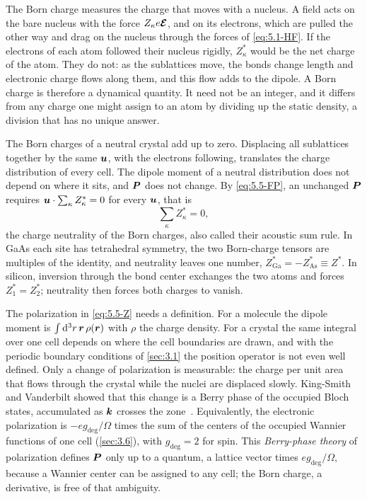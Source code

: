 The Born charge measures the charge that moves with a nucleus. A field acts on the bare nucleus with the force $Z_\kappa e\bm{\mathcal{E}}$, and on its electrons, which are pulled the other way and drag on the nucleus through the forces of \cref{eq:5.1-HF}. If the electrons of each atom followed their nucleus rigidly, $Z^*_\kappa$ would be the net charge of the atom. They do not: as the sublattices move, the bonds change length and electronic charge flows along them, and this flow adds to the dipole. A Born charge is therefore a dynamical quantity. It need not be an integer, and it differs from any charge one might assign to an atom by dividing up the static density, a division that has no unique answer.

The Born charges of a neutral crystal add up to zero. Displacing all sublattices together by the same $\bm{u}$, with the electrons following, translates the charge distribution of every cell. The dipole moment of a neutral distribution does not depend on where it sits, and $\bm{P}$ does not change. By \cref{eq:5.5-FP}, an unchanged $\bm{P}$ requires $\bm{u}\cdot\sum_\kappa Z^*_\kappa = 0$ for every $\bm{u}$, that is
\begin{equation}
  \sum_\kappa Z^*_\kappa = 0 ,
  \label{eq:5.5-neutral}
\end{equation}
the charge neutrality of the Born charges, also called their acoustic sum rule. In GaAs each site has tetrahedral symmetry, the two Born-charge tensors are multiples of the identity, and neutrality leaves one number, $Z^*_{\mathrm{Ga}} = -Z^*_{\mathrm{As}} \equiv Z^*$. In silicon, inversion through the bond center exchanges the two atoms and forces $Z^*_1 = Z^*_2$; neutrality then forces both charges to vanish.

The polarization in \cref{eq:5.5-Z} needs a definition. For a molecule the dipole moment is $\int\mathrm{d}^3r\,\bm{r}\,\rho(\bm{r})$ with $\rho$ the charge density. For a crystal the same integral over one cell depends on where the cell boundaries are drawn, and with the periodic boundary conditions of \cref{sec:3.1} the position operator is not even well defined. Only a change of polarization is measurable: the charge per unit area that flows through the crystal while the nuclei are displaced slowly. King-Smith and Vanderbilt showed that this change is a Berry phase of the occupied Bloch states, accumulated as $\bm{k}$ crosses the zone~\cite{kingsmith1993theory}. Equivalently, the electronic polarization is $-eg_{\mathrm{deg}}/\Omega$ times the sum of the centers of the occupied Wannier functions of one cell (\cref{sec:3.6}), with $g_{\mathrm{deg}} = 2$ for spin. This \emph{Berry-phase theory} of polarization defines $\bm{P}$ only up to a quantum, a lattice vector times $e g_{\mathrm{deg}}/\Omega$, because a Wannier center can be assigned to any cell; the Born charge, a derivative, is free of that ambiguity.

